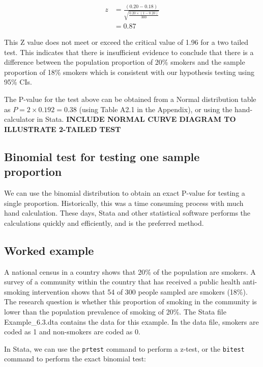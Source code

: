 \documentclass[
]{memoir}
\begin{document}
\[
\begin{aligned}
z &= \frac{(0.20 - 0.18)}{\sqrt{\frac{0.20 × (1 - 0.20)}{300}}} \\
 &= 0.87
\end{aligned}
\]

This Z value does not meet or exceed the critical value of 1.96 for a two tailed test. This indicates that there is insufficient evidence to conclude that there is a difference between the population proportion of 20\% smokers and the sample proportion of 18\% smokers which is consistent with our hypothesis testing using 95\% CIs.

The P-value for the test above can be obtained from a Normal distribution table as \(P = 2 × 0.192 = 0.38\) (using Table A2.1 in the Appendix), or using the hand-calculator in Stata. \textbf{INCLUDE NORMAL CURVE DIAGRAM TO ILLUSTRATE 2-TAILED TEST}

\hypertarget{binomial-test-for-testing-one-sample-proportion}{%
\subsection{Binomial test for testing one sample proportion}\label{binomial-test-for-testing-one-sample-proportion}}

We can use the binomial distribution to obtain an exact P-value for testing a single proportion. Historically, this was a time consuming process with much hand calculation. These days, Stata and other statistical software performs the calculations quickly and efficiently, and is the preferred method.

\hypertarget{worked-example-3}{%
\subsection{Worked example}\label{worked-example-3}}

A national census in a country shows that 20\% of the population are smokers. A survey of a community within the country that has received a public health anti-smoking intervention shows that 54 of 300 people sampled are smokers (18\%). The research question is whether this proportion of smoking in the community is lower than the population prevalence of smoking of 20\%. The Stata file Example\_6.3.dta contains the data for this example. In the data file, smokers are coded as 1 and non-smokers are coded as 0.

In Stata, we can use the \texttt{prtest} command to perform a z-test, or the \texttt{bitest} command to perform the exact binomial test:
\end{document}
